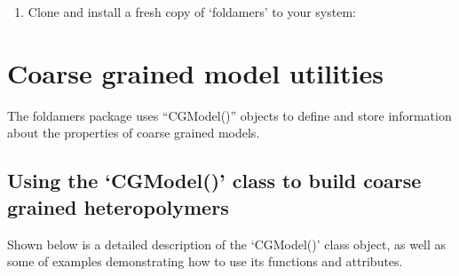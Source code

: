 \documentclass[letterpaper,12pt,english,openany,oneside]{sphinxmanual}
\begin{document}
\begin{enumerate}
\item {} 
Clone and install a fresh copy of ‘foldamers’ to your system:

\begin{sphinxVerbatim}[commandchars=\\\{\}]
  
 
  
\end{sphinxVerbatim}

\end{enumerate}


\chapter{Coarse grained model utilities}
\label{\detokenize{cg_model:coarse-grained-model-utilities}}\label{\detokenize{cg_model::doc}}
The foldamers package uses “CGModel()” objects to define and store information about the properties of coarse grained models.


\section{Using the ‘CGModel()’ class to build coarse grained heteropolymers}
\label{\detokenize{cg_model:using-the-cgmodel-class-to-build-coarse-grained-heteropolymers}}
Shown below is a detailed description of the ‘CGModel()’ class object, as well as some of examples demonstrating how to use its functions and attributes.

\label{\detokenize{cg_model:module-cg_model.cgmodel}}
\end{document}
